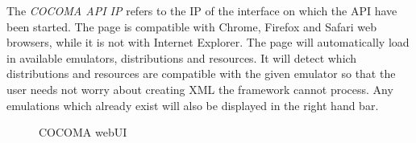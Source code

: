 \documentclass[letterpaper,10pt,english]{sphinxhowto}
\begin{document}
The \emph{COCOMA API IP} refers to the IP of the interface on which the API have been started. The page is compatible with Chrome, Firefox and Safari web browsers, while it is not with Internet Explorer. The page will automatically load in available emulators, distributions and resources. It will detect which distributions and resources are compatible with the given emulator so that the user needs not worry about creating XML the framework cannot process. Any emulations which already exist will also be displayed in the right hand bar.
\begin{figure}[htbp]
\centering
\capstart

\caption{COCOMA webUI}\end{figure}
\end{document}
